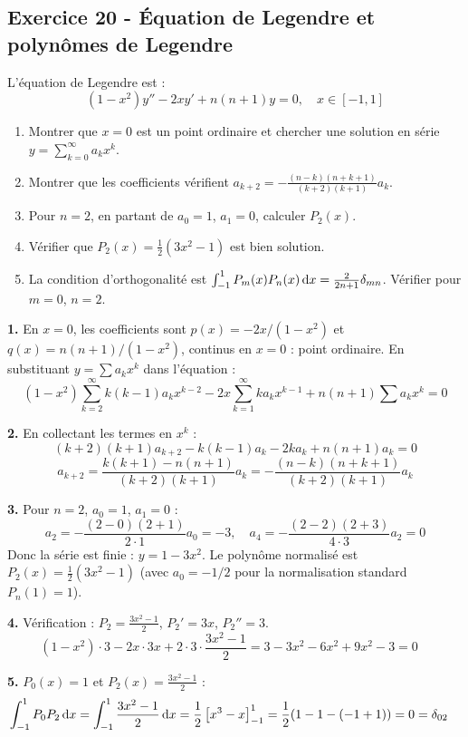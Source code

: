 \documentclass[12pt,a4paper]{article}
\begin{document}
\subsection*{Exercice 20 - Équation de Legendre et polynômes de Legendre \niveau{\difficile}}

\begin{boiteexercice}
L'équation de Legendre est :
\[
(1-x^2)y'' - 2xy' + n(n+1)y = 0, \quad x\in[-1,1]
\]
\begin{enumerate}
  \item Montrer que $x=0$ est un point ordinaire et chercher une solution en série $y = \sum_{k=0}^\infty a_k x^k$.
  \item Montrer que les coefficients vérifient $a_{k+2} = -\frac{(n-k)(n+k+1)}{(k+2)(k+1)}a_k$.
  \item Pour $n=2$, en partant de $a_0=1$, $a_1=0$, calculer $P_2(x)$.
  \item Vérifier que $P_2(x) = \frac{1}{2}(3x^2-1)$ est bien solution.
  \item La condition d'orthogonalité est $\int_{-1}^1 P_m(x)P_n(x)\,\mathrm{d} x = \frac{2}{2n+1}\delta_{mn}$. Vérifier pour $m=0$, $n=2$.
\end{enumerate}
\end{boiteexercice}

\begin{boitecorrige}
\textbf{1.} En $x=0$, les coefficients sont $p(x)=-2x/(1-x^2)$ et $q(x)=n(n+1)/(1-x^2)$, continus en $x=0$ : point ordinaire. En substituant $y = \sum a_k x^k$ dans l'équation :
\[
(1-x^2)\sum_{k=2}^\infty k(k-1)a_k x^{k-2} - 2x\sum_{k=1}^\infty ka_k x^{k-1} + n(n+1)\sum a_k x^k = 0
\]

\textbf{2.} En collectant les termes en $x^k$ :
\[
(k+2)(k+1)a_{k+2} - k(k-1)a_k - 2ka_k + n(n+1)a_k = 0
\]
\[
a_{k+2} = \frac{k(k+1)-n(n+1)}{(k+2)(k+1)}a_k = -\frac{(n-k)(n+k+1)}{(k+2)(k+1)}a_k
\]

\textbf{3.} Pour $n=2$, $a_0=1$, $a_1=0$ :
\[
a_2 = -\frac{(2-0)(2+1)}{2\cdot1}a_0 = -3, \quad a_4 = -\frac{(2-2)(2+3)}{4\cdot3}a_2 = 0
\]
Donc la série est finie : $y = 1 - 3x^2$. Le polynôme normalisé est $P_2(x) = \frac{1}{2}(3x^2-1)$ (avec $a_0 = -1/2$ pour la normalisation standard $P_n(1)=1$).

\textbf{4.} Vérification : $P_2 = \frac{3x^2-1}{2}$, $P_2' = 3x$, $P_2'' = 3$.
\[
(1-x^2)\cdot3 - 2x\cdot3x + 2\cdot3\cdot\frac{3x^2-1}{2} = 3-3x^2-6x^2+9x^2-3 = 0\quad
\]

\textbf{5.} $P_0(x)=1$ et $P_2(x) = \frac{3x^2-1}{2}$ :
\[
\int_{-1}^1 P_0 P_2\,\mathrm{d} x = \int_{-1}^1\frac{3x^2-1}{2}\,\mathrm{d} x = \frac{1}{2}\left[x^3-x\right]_{-1}^1 = \frac{1}{2}(1-1-(-1+1)) = 0 = \delta_{02}\quad
\]
\end{boitecorrige}
\end{document}
